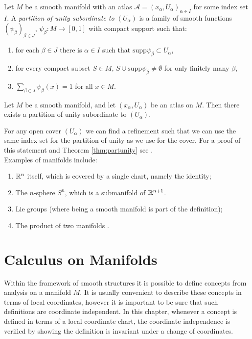 Let $M$ be a smooth manifold with an atlas $\mathcal{A}={(x_\alpha,
U_\alpha)}_{\alpha\in I}$ for some index set $I$. A \textit{partition of unity
subordinate to $(U_\alpha)$} is a family of smooth functions
$(\psi_\beta)_{\beta\in J}$, $\psi_\beta : M\rightarrow [0,1]$ with compact
support such that:
\begin{enumerate}
\item for each $\beta \in J$ there is $\alpha \in I$ such that
$\mbox{supp}\psi_\beta \subset U_\alpha$, 
\item for every compact subset $S\in M$, $S\cup \mbox{supp}\psi_{\beta}\neq
\emptyset$ for only finitely many $\beta$, 
\item $\sum_{\beta \in J} \psi_{\beta}(x)=1$ for all $x\in M$.\\
\end{enumerate}

\begin{thm}\label{thm:partunity}
Let $M$ be a smooth manifold, and let $(x_\alpha,U_\alpha)$ be an atlas on $M$.
Then there exists a partition of unity subordinate to $(U_\alpha)$.
\end{thm}

 For any open cover $(U_\alpha)$ we can find a refinement such that we can use
the same index set for the partition of unity as we use for the cover. For a
proof of this statement and Theorem \ref{thm:partunity} see \cite{Sternberg}.\\

Examples of manifolds include:
\begin{enumerate}
\item ${\mathbb R}^n$ itself, which is covered by a single chart, namely the identity;
\item The $n$-sphere $S^n$, which is a submanifold of ${\mathbb R}^{n+1}$.
\item Lie groups (where being a smooth manifold is part of the definition);
\item The product of two manifolds \cite{Carroll}.
\end{enumerate}

\section{Calculus on Manifolds}

Within the framework of smooth structures it is possible to define concepts from
analysis on a manifold $M$. It is usually convenient to describe these concepts
in terms of local coordinates, however it is important to be sure that such
definitions are coordinate independent. In this chapter, whenever a concept is
defined in terms of a local coordinate chart, the coordinate independence is
verified by showing the definition is invariant under a change of coordinates.\\


